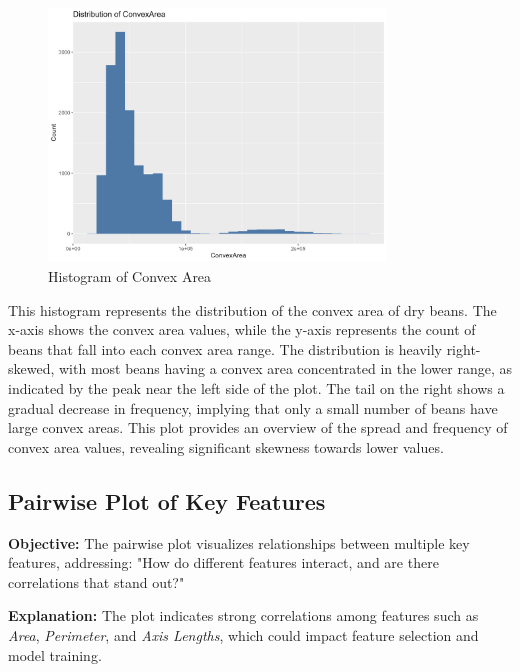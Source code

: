 \documentclass[a4paper,12pt]{article}
\begin{document}
\begin{figure}[H]
    \centering
    \includegraphics[width=0.8\textwidth]{graphs/histogram_convexarea.png}
    \caption{Histogram of Convex Area}
    \label{fig:histogram_convex_area}
\end{figure}
This histogram represents the distribution of the convex area of dry beans. The x-axis shows the convex area values, while the y-axis represents the count of beans that fall into each convex area range. The distribution is heavily right-skewed, with most beans having a convex area concentrated in the lower range, as indicated by the peak near the left side of the plot. The tail on the right shows a gradual decrease in frequency, implying that only a small number of beans have large convex areas. This plot provides an overview of the spread and frequency of convex area values, revealing significant skewness towards lower values.


\newpage


\subsection{Pairwise Plot of Key Features}
\noindent\textbf{Objective:} The pairwise plot visualizes relationships between multiple key features, addressing: "How do different features interact, and are there correlations that stand out?"

\noindent\textbf{Explanation:} The plot indicates strong correlations among features such as \textit{Area}, \textit{Perimeter}, and \textit{Axis Lengths}, which could impact feature selection and model training.
\end{document}
